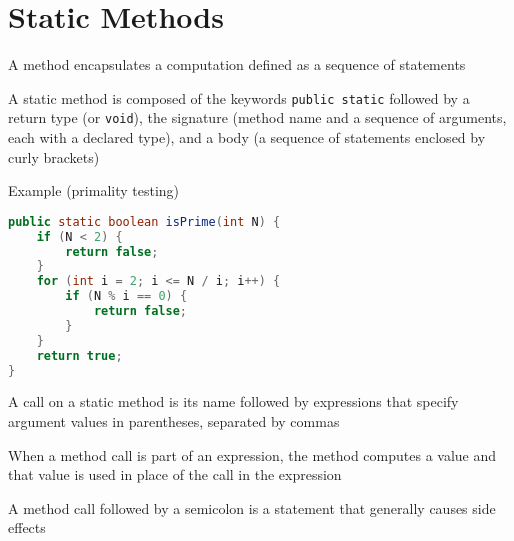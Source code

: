 \documentclass[8pt,a4paper,compress]{beamer}
\begin{document}
\section{Static Methods}
\begin{frame}[fragile]
A method encapsulates a computation defined as a sequence of statements

\bigskip

A static method is composed of the keywords \lstinline{public static} followed by a return type (or \lstinline{void}), the signature (method name and a sequence of arguments, each with a declared type), and a body (a sequence of statements enclosed by curly brackets)

\bigskip

Example (primality testing)
\begin{lstlisting}[language=Java]
public static boolean isPrime(int N) {
    if (N < 2) {
        return false;
    }
    for (int i = 2; i <= N / i; i++) {
        if (N % i == 0) {
            return false;
        }
    }
    return true;
}
\end{lstlisting}

\bigskip

A call on a static method is its name followed by expressions that specify argument values in parentheses, separated by commas

\bigskip

When a method call is part of an expression, the method computes a value and that value is used in place of the call in the expression

\bigskip

A method call followed by a semicolon is a statement that generally causes side effects
\end{frame}
\end{document}
